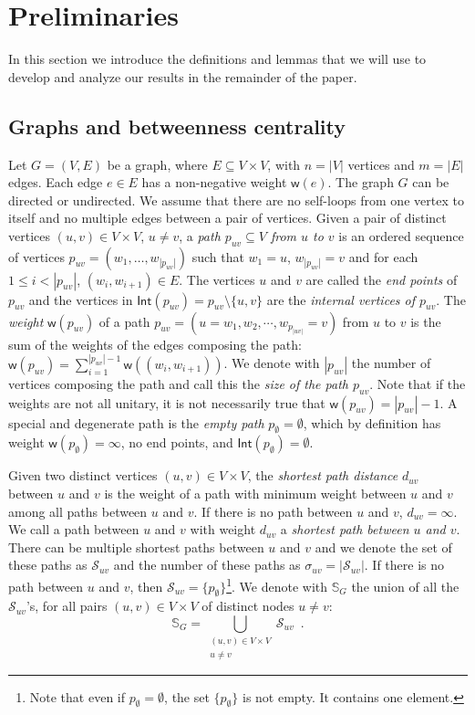 \section{Preliminaries}\label{sec:prelims}
In this section we introduce the definitions and lemmas that we will use to
develop and analyze our results in the remainder of the paper.

\subsection{Graphs and betweenness centrality}\label{sec:graphprelims}
Let $G=(V,E)$ be a graph, where $E\subseteq V\times V$, with $n=|V|$ vertices
and $m=|E|$ edges. Each edge
$e\in E$ has a non-negative weight $\mathsf{w}(e)$. The graph
$G$ can be directed or undirected. We assume
that there are no self-loops from one vertex to itself and no multiple edges
between a pair of vertices. Given a pair of distinct vertices $(u,v)\in V\times V$,
$u\neq v$, a \emph{path $p_{uv}\subseteq V$ from $u$ to $v$} is an ordered sequence of
vertices $p_{uv}=(w_1,\dotsc,w_{|p_{uv}|})$ such that $w_1=u$, $w_{|p_{uv}|}=v$ and
for each $1\le i < |p_{uv}|$, $(w_i,w_{i+1})\in E$. The vertices $u$ and $v$ are
called the \emph{end points} of $p_{uv}$ and the vertices in
$\mathsf{Int}(p_{uv})=p_{uv}\setminus\{u,v\}$ are the \emph{internal vertices of
$p_{uv}$}. The \emph{weight}
$\mathsf{w}(p_{uv})$ of a path $p_{uv}=(u=w_1,w_2,\cdots,w_{p_{|uv|}}=v)$ from
$u$ to $v$ is the sum of the weights of the edges composing the path:
$\mathsf{w}(p_{uv})=\sum_{i=1}^{|p_{uv}|-1}\mathsf{w}((w_i,w_{i+1}))$. We denote with
$|p_{uv}|$ the number of vertices composing the path and call this the
\emph{size of the path $p_{uv}$}. Note that if the weights are not all unitary,
it is not necessarily true that $\mathsf{w}(p_{uv})=|p_{uv}|-1$. A special and
degenerate path is the \emph{empty path} $p_{\emptyset}=\emptyset$, which by
definition has weight $\mathsf{w}(p_\emptyset)=\infty$, no end points, and
$\mathsf{Int}(p_\emptyset)=\emptyset$.

Given two distinct vertices $(u,v)\in V\times V$, the \emph{shortest path distance}
$d_{uv}$ between $u$ and $v$ is the weight of a path with minimum weight 
between $u$ and $v$ among all paths between $u$ and $v$. If there is no path
between $u$ and $v$, $d_{uv}=\infty$. We call a path between $u$ and $v$ with
weight $d_{uv}$ a \emph{shortest path between $u$ and $v$}. There can be
multiple shortest paths between $u$ and $v$ and we denote the set of these paths
as $\mathcal{S}_{uv}$ and the number of these paths as
$\sigma_{uv}=|\mathcal{S}_{uv}|$. If there is no path between $u$ and $v$, then
$\mathcal{S}_{uv}=\{p_\emptyset\}$\footnote{Note that even if
$p_\emptyset=\emptyset$, the set $\{p_\emptyset\}$ is not empty. It contains
one element.}.
We denote with $\mathbb{S}_G$ the union of all the $\mathcal{S}_{uv}$'s, for all
pairs $(u,v)\in V\times V$ of distinct nodes $u\neq v$: 
\[ \mathbb{S}_G=\bigcup_{\substack{(u,v)\in V\times V \\ u\neq v}}\mathcal{S}_{uv}\enspace.\]

